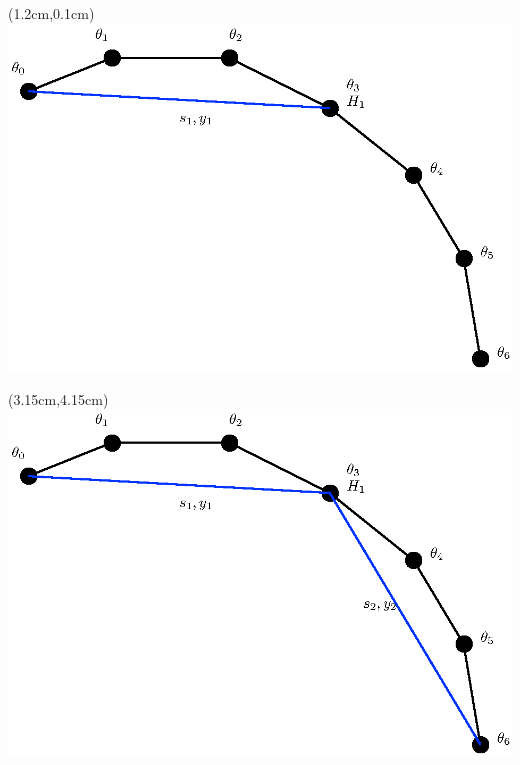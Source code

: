 \documentclass{beamer}
\begin{document}
							 \begin{frame}
\begin{textblock*}{0.2cm}(1.2cm,0.1cm) %
							 				\includegraphics[scale=0.5]{figures/3.eps}
\end{textblock*}
							 \end{frame}
							 \begin{frame}
\begin{textblock*}{0.2cm}(3.15cm,4.15cm) %
							 				\includegraphics[scale=0.5]{figures/2.eps}
\end{textblock*}
							 \end{frame}
\end{document}
